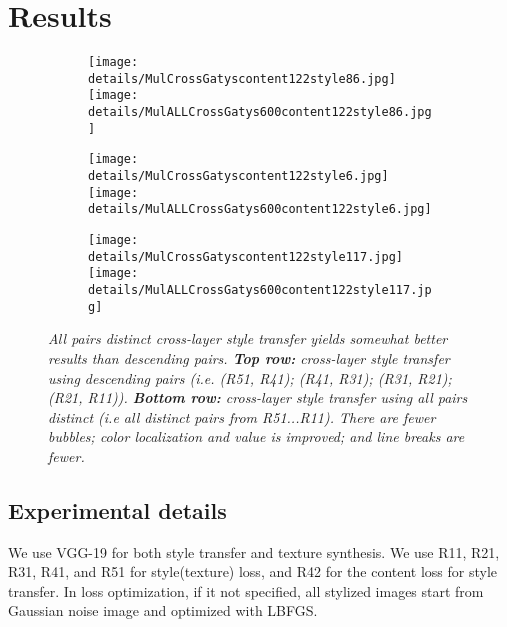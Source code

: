 \documentclass[runningheads]{llncs}
\begin{document}
\section{Results}


\begin{figure}[!htbp]
\centering
\small 
\begin{subfigure}[t]{0.3\linewidth}
    \texttt{[image: details/MulCrossGatyscontent122style86.jpg]}
    \texttt{[image: details/MulALLCrossGatys600content122style86.jpg]}
\end{subfigure}
\begin{subfigure}[t]{0.3\linewidth}
    \texttt{[image: details/MulCrossGatyscontent122style6.jpg]}
    \texttt{[image: details/MulALLCrossGatys600content122style6.jpg]}
\end{subfigure}
\begin{subfigure}[t]{0.3\linewidth}
    \texttt{[image: details/MulCrossGatyscontent122style117.jpg]}
    \texttt{[image: details/MulALLCrossGatys600content122style117.jpg]}
\end{subfigure}
\caption{\em All pairs distinct cross-layer style transfer yields somewhat better results than descending pairs.  {\bf
    Top row:} cross-layer style transfer using descending pairs (i.e. (R51, R41); (R41, R31); (R31, R21); (R21, R11)).
  {\bf Bottom row:}  cross-layer style transfer using all pairs distinct (i.e  all distinct pairs from R51...R11).
There are fewer bubbles; color localization and value is improved; and line breaks are fewer.
  \label{fig:CGALL}}
\end{figure}
\subsection{Experimental details}

We use VGG-19 for both style transfer and texture synthesis.  We use R11, R21, R31, R41, and R51 for style(texture) loss, and R42 for the content loss for style transfer. In loss optimization, if it not specified, all stylized images start from Gaussian noise image and optimized with LBFGS.
\end{document}
